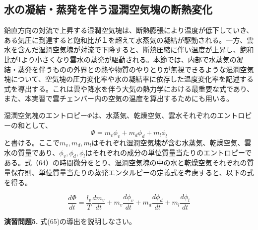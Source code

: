 \documentclass{jsarticle}
\begin{document}
\subsection{水の凝結・蒸発を伴う湿潤空気塊の断熱変化}
鉛直方向の対流で上昇する湿潤空気塊は、断熱膨張により温度が低下していき、ある気圧に到達すると飽和比が１を超えて水蒸気の凝結が駆動される。一方、雲水を含んだ湿潤空気塊が対流で下降すると、断熱圧縮に伴い温度が上昇し、飽和比が1より小さくなり雲水の蒸発が駆動される。本節では、内部で水蒸気の凝結・蒸発を伴うものの外界との熱や物質のやりとりが無視できるような湿潤空気塊について、空気塊の圧力変化率や水の凝結率に依存した温度変化率を記述する式を導出する。これは雲や降水を伴う大気の熱力学における最重要な式であり、また、本実習で雲チェンバー内の空気の温度を算出するためにも用いる。

湿潤空気塊のエントロピー$\Phi$は、水蒸気、乾燥空気、雲水それぞれのエントロピーの和として、
\begin{equation}
 \Phi = m_{v}\phi_{v}+m_{d}\phi_{d}+m_{l}\phi_{l}
\end{equation}
と書ける。ここで$m_{v}, m_{d}, m_{l}$はそれぞれ湿潤空気塊が含む水蒸気、乾燥空気、雲水の質量であり、$\phi_{v}, \phi_{d}, \phi_{l}$はそれぞれの成分の単位質量当たりのエントロピーである。式（64）の時間微分をとり、湿潤空気塊の中の水と乾燥空気それぞれの質量保存則、単位質量当たりの蒸発エンタルピーの定義式を考慮すると、以下の式を得る。

\begin{equation}
 \frac{d\Phi}{dt} = \frac{l_{v}}{T}\frac{dm_{v}}{dt}+m_{v}\frac{d\phi_{v}}{dt}+m_{d}\frac{d\phi_{d}}{dt}+m_{l}\frac{d\phi_{l}}{dt}
\end{equation}


\begin{itembox}[l]{\bf{演習問題5.}}
式(65)の導出を説明しなさい。
\end{itembox}
\\
\end{document}
